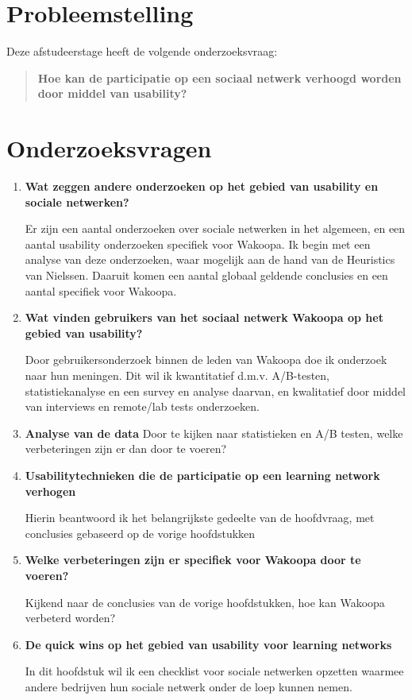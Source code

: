 \documentclass[a4paper, 10pt, pdftex]{article}
\begin{document}
\section{Probleemstelling}
Deze afstudeerstage heeft de volgende onderzoeksvraag:
\begin{quotation}

 \textbf{Hoe kan de participatie op een sociaal netwerk verhoogd worden door middel van usability?}
\end{quotation}


\section{Onderzoeksvragen}
\begin{enumerate}
\item
 \textbf{Wat zeggen andere onderzoeken op het gebied van usability en sociale netwerken?}

Er zijn een aantal onderzoeken over sociale netwerken in het algemeen, en een aantal usability onderzoeken specifiek voor Wakoopa. Ik begin met een analyse van deze onderzoeken, waar mogelijk aan de hand van de Heuristics van Nielssen. Daaruit komen een aantal globaal geldende conclusies en een aantal specifiek voor Wakoopa.

\item
\textbf{Wat vinden gebruikers van het sociaal netwerk Wakoopa op het gebied van usability?}

Door gebruikersonderzoek binnen de leden van Wakoopa doe ik onderzoek naar hun meningen. Dit wil ik kwantitatief d.m.v. A/B-testen, statistiekanalyse en een survey en analyse daarvan, en kwalitatief door middel van interviews en remote/lab tests onderzoeken.

\item
\textbf{Analyse van de data}
Door te kijken naar statistieken en A/B testen, welke verbeteringen zijn er dan door te voeren?

\item
\textbf{Usabilitytechnieken die de participatie op een learning network verhogen}

Hierin beantwoord ik het belangrijkste gedeelte van de hoofdvraag, met conclusies gebaseerd op de vorige hoofdstukken

\item
\textbf{Welke verbeteringen zijn er specifiek voor Wakoopa door te voeren?}

Kijkend naar de conclusies van de vorige hoofdstukken, hoe kan Wakoopa verbeterd worden?

\item
\textbf{De quick wins op het gebied van usability voor learning networks}

In dit hoofdstuk wil ik een checklist voor sociale netwerken opzetten waarmee andere bedrijven hun sociale netwerk onder de loep kunnen nemen.
\end{enumerate}
\end{document}
